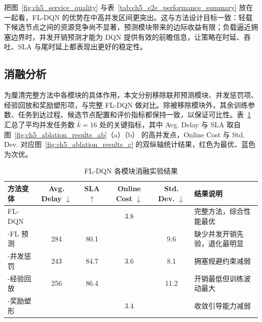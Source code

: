 把图~\ref{fig:ch5_service_quality} 与表~\ref{tab:ch5_e2e_performance_summary} 放在一起看，FL-DQN 的优势在中高并发区间更突出。这与方法设计目标一致：轻载下候选节点之间的资源竞争尚不显著，预测模块带来的边际收益有限；负载逼近拥塞边界时，并发开销预测才能为 DQN 提供有效的前瞻信息，让策略在时延、吞吐、SLA 与尾时延上都表现出更好的稳定性。
\subsection{消融分析}
\label{subsec:ch5_ablation_results}

为厘清完整方法中各模块的具体作用，本文分别移除联邦预测模块、并发惩罚项、经验回放和奖励塑形项，与完整 FL-DQN 做对比。除被移除模块外，其余训练参数、任务到达过程、候选节点配置和评价指标都保持一致，以保证可比性。表~\ref{tab:ch5_ablation_summary} 汇总了平均并发任务数 $\bar{k}=16$ 处的关键指标，其中 Avg. Delay 与 SLA 取自图~\ref{fig:ch5_ablation_results_ab}（a）（b） 的高并发点，Online Cost 与 Std. Dev. 对应图~\ref{fig:ch5_ablation_results_c} 的双纵轴统计结果，红色为最优、蓝色为次优。

\begin{table}[H]
    \centering
    \footnotesize
    \caption{FL-DQN 各模块消融实验结果}
    \label{tab:ch5_ablation_summary}
    \setlength{\tabcolsep}{2.3mm}
    \renewcommand{\arraystretch}{1.18}
    \begin{tabular}{lccccp{3.1cm}}
        \toprule
        \rowcolor{gray!10}
        方法变体
         & Avg. Delay $\downarrow$
         & SLA $\uparrow$
         & Online Cost $\downarrow$
         & Std. Dev. $\downarrow$
         & 结果说明                          \\
        \midrule
        FL-DQN
         & \cellcolor{bestcolor}{209}
         & \cellcolor{bestcolor}{91.2}
         & 3.8
         & \cellcolor{bestcolor}{5.1}
         & 完整方法，综合性能最优                   \\

        -FL 预测
         & 284
         & 80.1
         & \cellcolor{secondcolor}{3.1}
         & 9.6
         & 缺少并发开销先验，退化最明显                \\

        -并发惩罚
         & 243
         & 84.7
         & 3.6
         & 8.1
         & 拥塞规避约束减弱                      \\

        -经验回放
         & 256
         & 86.4
         & \cellcolor{bestcolor}{2.4}
         & 11.2
         & 开销最低但训练波动最大                   \\

        -奖励塑形
         & \cellcolor{secondcolor}{238}
         & \cellcolor{secondcolor}{87.9}
         & 3.4
         & \cellcolor{secondcolor}{7.3}
         & 收敛引导能力减弱                      \\
        \bottomrule
    \end{tabular}
\end{table}

